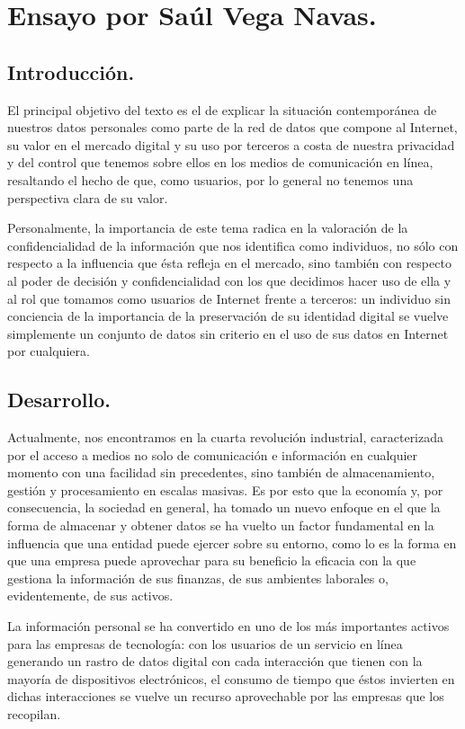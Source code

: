 \section*{Ensayo por Saúl Vega Navas.}
\subsection*{Introducción.}
El principal objetivo del texto es el de explicar la situación contemporánea de nuestros datos personales como parte de la red de datos que compone al Internet, su valor en el mercado digital y su uso por terceros a costa de nuestra privacidad y del control que tenemos sobre ellos en los medios de comunicación en línea, resaltando el hecho de que, como usuarios, por lo general no tenemos una perspectiva clara de su valor.

Personalmente, la importancia de este tema radica en la valoración de la confidencialidad de la información que nos identifica como individuos, no sólo con respecto a la influencia que ésta refleja en el mercado, sino también con respecto al poder de decisión y confidencialidad con los que decidimos hacer uso de ella y al rol que tomamos como usuarios de Internet frente a terceros: un individuo sin conciencia de la importancia de la preservación de su identidad digital se vuelve simplemente un conjunto de datos sin criterio en el uso de sus datos en Internet por cualquiera.
\subsection*{Desarrollo.}
Actualmente, nos encontramos en la cuarta revolución industrial, caracterizada por el acceso a medios no solo de comunicación e información en cualquier momento con una facilidad sin precedentes, sino también de almacenamiento, gestión y procesamiento en escalas masivas. Es por esto que la economía y, por consecuencia, la sociedad en general, ha tomado un nuevo enfoque en el que la forma de almacenar y obtener datos se ha vuelto un factor fundamental en la influencia que una entidad puede ejercer sobre su entorno, como lo es la forma en que una empresa puede aprovechar para su beneficio la eficacia con la que gestiona la información de sus finanzas, de sus ambientes laborales o, evidentemente, de sus activos.

La información personal se ha convertido en uno de los más importantes activos para las empresas de tecnología: con los usuarios de un servicio en línea generando un rastro de datos digital con cada interacción que tienen con la mayoría de dispositivos electrónicos, el consumo de tiempo que éstos invierten en dichas interacciones se vuelve un recurso aprovechable por las empresas que los recopilan.

